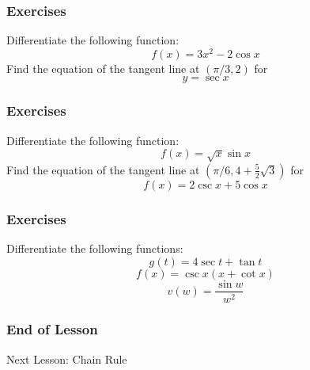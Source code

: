 \documentclass[xcolor=dvipsnames]{beamer}
\begin{document}
\begin{frame}
  \frametitle{Exercises}
{\ubung} Differentiate the following function:
\begin{equation}
  \label{eq:hupuxahz}
  f(x)=3x^{2}-2\cos{}x
\end{equation}
{\ubung} Find the equation of the tangent line at $(\pi/3,2)$ for
\begin{equation}
  \label{eq:hoirohfo}
  y=\sec{}x
\end{equation}
\end{frame}

\begin{frame}
  \frametitle{Exercises}
{\ubung} Differentiate the following function:
\begin{equation}
  \label{eq:vithooke}
  f(x)=\sqrt{x}\sin{}x
\end{equation}
{\ubung} Find the equation of the tangent line at $(\pi/6,4+\frac{5}{2}\sqrt{3})$ for
\begin{equation}
  \label{eq:chaequin}
  f(x)=2\csc{}x+5\cos{}x
\end{equation}
\end{frame}

\begin{frame}
  \frametitle{Exercises}
{\ubung} Differentiate the following functions:
\begin{equation}
  \label{eq:hohxenoo}
  g(t)=4\sec{}t+\tan{}t
\end{equation}
\begin{equation}
  \label{eq:zichoope}
  f(x)=\csc{}x(x+\cot{}x)
\end{equation}
\begin{equation}
  \label{eq:tohsohgh}
  v(w)=\frac{\sin{}w}{w^{2}}
\end{equation}
\end{frame}

\begin{frame}
  \frametitle{End of Lesson}
Next Lesson: Chain Rule
\end{frame}
\end{document}
